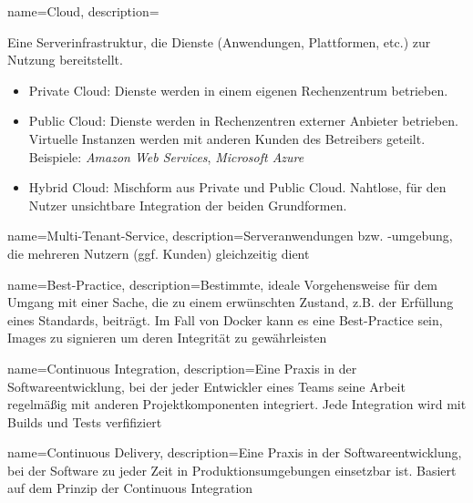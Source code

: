 



{%
  name={Cloud},
  description={Eine Serverinfrastruktur, die Dienste (Anwendungen, Plattformen, etc.) zur Nutzung bereitstellt.
    \begin{itemize}
      \item Private Cloud: Dienste werden in einem eigenen Rechenzentrum betrieben.
      \item Public Cloud: Dienste werden in Rechenzentren externer Anbieter betrieben. Virtuelle Instanzen werden mit anderen Kunden des Betreibers geteilt. Beispiele: \emph{Amazon Web Services}, \emph{Microsoft Azure}
      \item Hybrid Cloud: Mischform aus Private und Public Cloud. Nahtlose, für den Nutzer unsichtbare Integration der beiden Grundformen.
    \end{itemize}
  }
}

{%
  name={Multi-Tenant-Service},
  description={Serveranwendungen bzw. -umgebung, die mehreren Nutzern (ggf. Kunden) gleichzeitig dient}
}

{%
  name={Best-Practice},
  description={Bestimmte, ideale Vorgehensweise für dem Umgang mit einer Sache, die zu einem erwünschten Zustand, z.B. der Erfüllung eines Standards, beiträgt. Im Fall von Docker kann es eine Best-Practice sein, Images zu signieren um deren Integrität zu gewährleisten}
}

{%
  name={Continuous Integration},
  description={Eine Praxis in der Softwareentwicklung, bei der jeder Entwickler eines Teams seine Arbeit regelmäßig mit anderen Projektkomponenten integriert. Jede Integration wird mit Builds und Tests verfifiziert \cite{http://www.martinfowler.com/articles/continuousIntegration.html}}
}

{%
  name={Continuous Delivery},
  description={Eine Praxis in der Softwareentwicklung, bei der Software zu jeder Zeit in Produktionsumgebungen einsetzbar ist. Basiert auf dem Prinzip der Continuous Integration \cite{http://martinfowler.com/bliki/ContinuousDelivery.html}}
}


